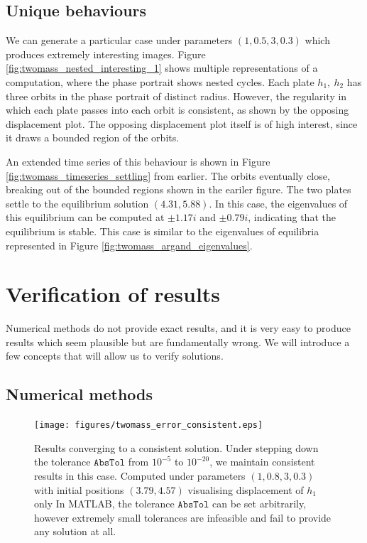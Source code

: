 \documentclass{report}
\begin{document}
\subsection{Unique behaviours}

We can generate a particular case under parameters \((1,0.5,3,0.3)\) which produces extremely interesting images.
Figure \ref{fig:twomass_nested_interesting_1} shows multiple representations of a computation,
where the phase portrait shows nested cycles.
Each plate $h_1,~h_2$ has three orbits in the phase portrait of distinct radius.
However, the regularity in which each plate passes into each orbit is consistent,
as shown by the opposing displacement plot.
The opposing displacement plot itself is of high interest,
since it draws a bounded region of the orbits.

An extended time series of this behaviour is shown in Figure \ref{fig:twomass_timeseries_settling} from earlier.
The orbits eventually close, breaking out of the bounded regions shown in the eariler figure.
The two plates settle to the equilibrium solution \((4.31,5.88)\).
In this case, the eigenvalues of this equilibrium can be computed at $\pm 1.17i$ and $\pm 0.79i$,
indicating that the equilibrium is stable.
This case is similar to the eigenvalues of equilibria represented in Figure \ref{fig:twomass_argand_eigenvalues}.

\section{Verification of results}

Numerical methods do not provide exact results,
and it is very easy to produce results which seem plausible but are fundamentally wrong.
We will introduce a few concepts that will allow us to verify solutions.

\subsection{Numerical methods}

\begin{figure}
    \centering
    \texttt{[image: figures/twomass\_error\_consistent.eps]}
    \caption{
        Results converging to a consistent solution.
        Under stepping down the tolerance \(\mathtt{AbsTol}\) from $10^{-5}$ to $10^{-20}$,
        we maintain consistent results in this case.
        Computed under parameters \((1, 0.8, 3, 0.3)\) with initial positions \((3.79, 4.57)\) visualising displacement of $h_1$ only
        In MATLAB, the tolerance $\mathtt{AbsTol}$ can be set arbitrarily,
        however extremely small tolerances are infeasible and fail to provide any solution at all.
    }
    \label{fig:twomass_stepping_convergence}
\end{figure}
\end{document}

